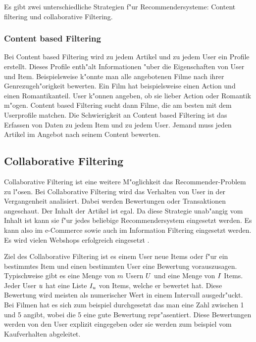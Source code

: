\documentclass[a4paper, 11pt]{article}
\begin{document}
Es gibt zwei unterschiedliche Strategien f"ur Recommendersysteme: Content filtering und collaborative Filtering. 

\subsubsection{Content based Filtering}
\label{sec:contentbased}

Bei Content based Filtering wird zu jedem Artikel und zu jedem User ein Profile erstellt. Dieses Profile enth"alt Informationen "uber die Eigenschaften von User und Item. Beispielsweise k"onnte man alle angebotenen Filme nach ihrer Genrezugeh"origkeit bewerten. Ein Film hat beispielsweise einen Action und einen Romantikanteil. User k"onnen angeben, ob sie lieber Action oder Romantik m"ogen. Content based Filtering sucht dann Filme, die am besten mit dem Userprofile matchen. Die Schwierigkeit an Content based Filtering ist das Erfassen von Daten zu jedem Item und zu jedem User. Jemand muss jeden Artikel im Angebot nach seinem Content bewerten.

\subsection{Collaborative Filtering}
\label{sec:collaborativefiltering}

Collaborative Filtering ist eine weitere M"oglichkeit das Re\-commender-Prob\-lem zu l"osen. Bei Collaborative Filtering wird das Verhalten von User in der Vergangenheit analisiert. Dabei werden Bewertungen oder Transaktionen angeschaut. Der Inhalt der Artikel ist egal. Da diese Strategie unab"angig vom Inhalt ist kann sie f"ur jedes beliebige Recommendersystem eingesetzt werden. Es kann also im e-Commerce sowie auch im Information Filtering eingesetzt werden.  Es wird vielen Webshops erfolgreich eingesetzt \cite{sarwar01}. 

Ziel des Collaborative Filtering ist es einem User neue Items oder f"ur ein bestimmtes Item und einen bestimmten User eine Bewertung vorauszusagen. Typischweise gibt es eine Menge von $m$ Usern  $\mathnormal{U}$ und eine Menge von $ \mathnormal{I} $ Items. Jeder User $\mathnormal{u}$ hat eine Liste $\mathnormal{I_u}$ von Items, welche er bewertet hat. Diese Bewertung wird meisten als numerischer Wert in einem Intervall ausgedr"uckt. Bei Filmen hat es sich zum beispiel durchgesetzt das man eine Zahl zwischen 1 und 5 angibt, wobei die 5 eine gute Bewertung repr"asentiert. Diese Bewertungen werden von den User explizit eingegeben oder sie werden zum beispiel vom Kaufverhalten abgeleitet.
\end{document}
